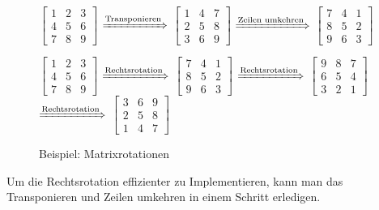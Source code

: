\documentclass[11pt]{article}
\begin{document}
\begin{figure}[h]
  
\begin{center}
  
$\begin{bmatrix}
  1 & 2 & 3\\
  4 & 5 & 6\\
  7 & 8 & 9
\end{bmatrix}$
$\xRightarrow[]{\text{Transponieren}}$
$\begin{bmatrix}
  1 & 4 & 7\\
  2 & 5 & 8\\
  3 & 6 & 9
\end{bmatrix}$
$\xRightarrow[]{\text{Zeilen umkehren}}$
$\begin{bmatrix}
  7 & 4 & 1\\
  8 & 5 & 2\\
  9 & 6 & 3
\end{bmatrix}$
\end{center}

\begin{center}
  
  $\begin{bmatrix}
    1 & 2 & 3\\
    4 & 5 & 6\\
    7 & 8 & 9
  \end{bmatrix}$
  $\xRightarrow[]{\text{Rechtsrotation}}$
  $\begin{bmatrix}
    7 & 4 & 1\\
    8 & 5 & 2\\
    9 & 6 & 3
  \end{bmatrix}$
  $\xRightarrow[]{\text{Rechtsrotation}}$
  $\begin{bmatrix}
    9 & 8 & 7\\
    6 & 5 & 4\\
    3 & 2 & 1
  \end{bmatrix}$
  $\xRightarrow[]{\text{Rechtsrotation}}$
  $\begin{bmatrix}
    3 & 6 & 9\\
    2 & 5 & 8\\
    1 & 4 & 7
  \end{bmatrix}$
\end{center}

\caption{Beispiel: Matrixrotationen}

\end{figure}

Um die Rechtsrotation effizienter zu Implementieren, kann man das Transponieren und Zeilen umkehren in einem Schritt erledigen.
\end{document}
